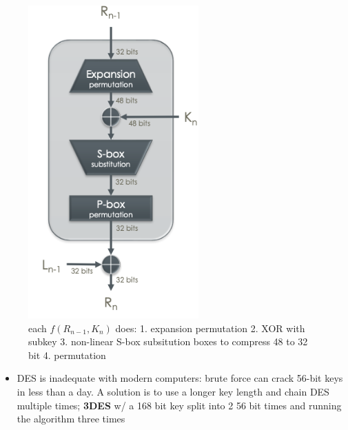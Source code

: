 \documentclass[../notes.tex]{subfiles}
\begin{document}
\begin{figure}[H]
    \centering
    \includegraphics[width=0.8\linewidth]{img/image_2023-02-10-00-10-31.png}
    \caption{each $ f(R_{n-1}, K_n) $ does: 1. expansion permutation 2. XOR with subkey 3. non-linear S-box subsitution boxes to compress 48 to 32 bit 4. permutation}
\end{figure}


\begin{itemize}
    \item DES is inadequate with modern computers: brute force can crack 56-bit keys in less than a day. A solution is to use a longer key length and chain DES multiple times; \textbf{3DES} w/ a 168 bit key split into 2 56 bit times and running the algorithm three times
\end{itemize}
\end{document}
